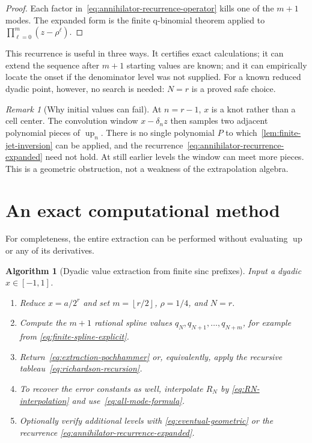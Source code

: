 \documentclass[11pt,a4paper]{article}
\newtheorem{algorithm}[theorem]{Algorithm}
\theoremstyle{remark}
\newtheorem{remark}[theorem]{Remark}
\newcommand{\up}{\operatorname{up}}
\newcommand{\floor}[1]{\left\lfloor #1\right\rfloor}
\begin{document}
\begin{proof}
Each factor in~\eqref{eq:annihilator-recurrence-operator} kills one of the
$m+1$ modes.  The expanded form is the finite q-binomial theorem applied to
$\prod_{\ell=0}^{m}(z-\rho^\ell)$.
\end{proof}

This recurrence is useful in three ways.  It certifies exact calculations;
it can extend the sequence after $m+1$ starting values are known; and it can
empirically locate the onset if the denominator level was not supplied.  For
a known reduced dyadic point, however, no search is needed: $N=r$ is a proved
safe choice.

\begin{remark}[Why initial values can fail]
At $n=r-1$, $x$ is a knot rather than a cell center.  The convolution window
$x-\delta_nz$ then samples two adjacent polynomial pieces of $\up_n$.  There is
no single polynomial $P$ to which~\cref{lem:finite-jet-inversion} can be
applied, and the recurrence~\eqref{eq:annihilator-recurrence-expanded} need not
hold.  At still earlier levels the window can meet more pieces.  This is a
geometric obstruction, not a weakness of the extrapolation algebra.
\end{remark}

\section{An exact computational method}
\label{sec:algorithm}

For completeness, the entire extraction can be performed without evaluating
$\up$ or any of its derivatives.

\begin{algorithm}[Dyadic value extraction from finite sinc prefixes]
\label{alg:dyadic-extraction}
Input a dyadic $x\in[-1,1]$.

\begin{enumerate}
\item Reduce $x=a/2^r$ and set $m=\floor{r/2}$, $\rho=1/4$, and $N=r$.
\item Compute the $m+1$ rational spline values
$q_{N},q_{N+1},\ldots,q_{N+m}$, for example from
\eqref{eq:finite-spline-explicit}.
\item Return~\eqref{eq:extraction-pochhammer} or, equivalently, apply the
recursive tableau~\eqref{eq:richardson-recursion}.
\item To recover the error constants as well, interpolate $R_N$ by
\eqref{eq:RN-interpolation} and use~\eqref{eq:all-mode-formula}.
\item Optionally verify additional levels with
\eqref{eq:eventual-geometric} or the recurrence
\eqref{eq:annihilator-recurrence-expanded}.
\end{enumerate}
\end{algorithm}
\end{document}
